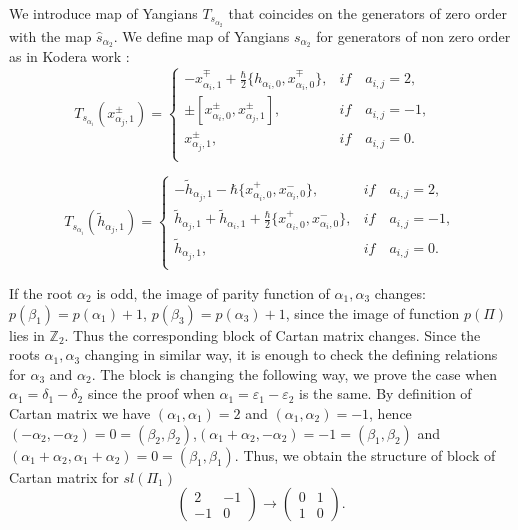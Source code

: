 \documentclass[english]{elsarticle}
\numberwithin{equation}{section}
\begin{document}
We introduce map of Yangians $T_{s_{\alpha_2}}$ that coincides on the generators of zero order with the map $\hat{s}_{\alpha_2}$.
We define map of Yangians $s_{\alpha_2}$ for generators of non zero order as in Kodera work \cite{Kodera}:
\[
T_{s_{\alpha_i}}(x_{\alpha_j,1}^{\pm})=
\begin{cases}
    -x_{\alpha_i,1}^{\mp}+\frac{\hbar}{2}\{h_{\alpha_i,0},x_{\alpha_i,0}^{\mp}\}, & if \quad a_{i,j}=2,\\
    \pm[x_{\alpha_i,0}^{\pm},x_{\alpha_j,1}^{\pm}], & if \quad a_{i,j}=-1,\\
     x_{\alpha_j,1}^{\pm}, & if \quad a_{i,j}=0.\\
\end{cases} \quad
\]

\[ T_{s_{\alpha_i}}(\tilde{h}_{\alpha_j,1})=
\begin{cases}
    -\tilde{h}_{\alpha_j,1}-\hbar\{x_{\alpha_i,0}^{+},x_{\alpha_i,0}^{-}\},& if \quad a_{i,j}=2,\\
    \tilde{h}_{\alpha_j,1}+\tilde{h}_{\alpha_i,1}+\frac{\hbar}{2}\{x_{\alpha_i,0}^{+},x_{\alpha_i,0}^{-}\}, & if \quad a_{i,j}=-1, \\
    \tilde{h}_{\alpha_j,1},& if \quad a_{i,j}=0.\\
\end{cases}
\]


If the root $\alpha_2$ is odd, the image of parity function of $\alpha_1, \alpha_3$ changes: $p(\beta_1)=p(\alpha_1)+1$, $p(\beta_3)=p(\alpha_3)+1$, since the image of function $p(\Pi)$ lies in $\mathbb{Z}_2$. Thus the corresponding block of Cartan matrix changes. Since the roots $\alpha_1, \alpha_3$ changing in similar way, it is enough to check the defining relations for $\alpha_3$ and $\alpha_2$.
The block is changing the following way, we prove the case when $\alpha_1=\delta_1-\delta_2$ since the proof when $\alpha_1=\varepsilon_1-\varepsilon_2$ is the same. By definition of Cartan matrix we have $(\alpha_1,\alpha_1)=2$ and $(\alpha_1,\alpha_2)=-1$, hence $(-\alpha_2,-\alpha_2)=0=(\beta_2,\beta_2)$,$(\alpha_1+\alpha_2,-\alpha_2)=-1=(\beta_1,\beta_2)$ and $(\alpha_1+\alpha_2,\alpha_1+\alpha_2)=0=(\beta_1,\beta_1)$. Thus, we obtain the structure of block of Cartan matrix for $sl(\Pi_1)$
\begin{equation}
\begin{pmatrix}
     2 & -1\\
    -1 & 0
    \end{pmatrix} \rightarrow \begin{pmatrix}
    0 & 1\\
    1 & 0
    \end{pmatrix}.
\end{equation}
\end{document}
